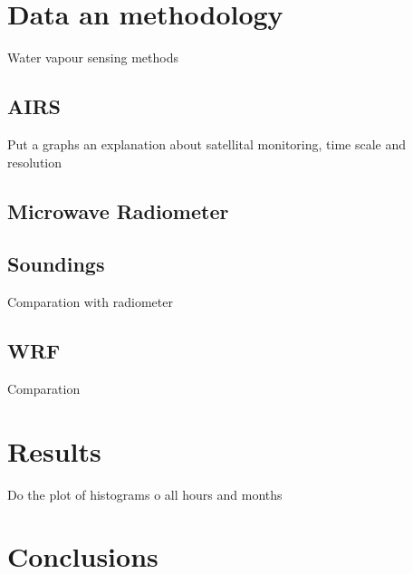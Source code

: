 \documentclass{ametsoc}
\begin{document}
\section*{Data an methodology}
Water vapour sensing methods
\subsection*{AIRS}
Put a graphs an explanation about satellital monitoring, time scale and resolution
\subsection*{Microwave Radiometer}

\subsection*{Soundings}
Comparation with radiometer
\subsection*{WRF}
Comparation

\section*{Results}
Do the plot of histograms o all hours and months

\section*{Conclusions}


%


\end{document}
